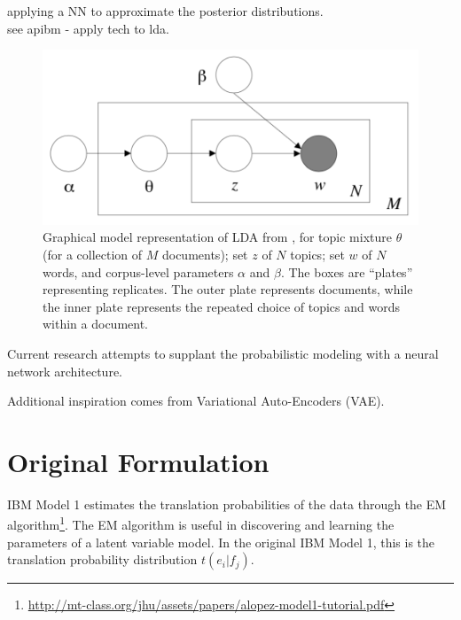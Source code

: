 \documentclass[twoside,twocolumn]{article}
\begin{document}
applying a NN to approximate the posterior distributions.\\
see apibm - apply tech to lda.\\
\cite{blei2003latent}
\cite{kingma2013auto}

\begin{figure}
\centering
\includegraphics[scale=0.5]{LDADiagram}
\caption{Graphical model representation of LDA from \cite{blei2003latent}, for topic mixture $\theta$ (for a collection of $M$ documents); set $z$ of $N$ topics; set $w$ of $N$ words, and corpus-level parameters $\alpha$ and $\beta$. The boxes are ``plates'' representing replicates. The outer plate represents documents, while the inner plate represents the repeated choice of topics and words within a document. }
\end{figure}

Current research attempts to supplant the probabilistic modeling with a neural network architecture.

Additional inspiration comes from Variational Auto-Encoders (VAE).

\section{Original Formulation}

IBM Model 1 estimates the translation probabilities of the data through the EM algorithm\footnote{\url{http://mt-class.org/jhu/assets/papers/alopez-model1-tutorial.pdf}}. The EM algorithm is useful in discovering and learning the parameters of a latent variable model. In the original IBM Model 1, this is the translation probability distribution $t(e_i|f_j)$.
\end{document}
